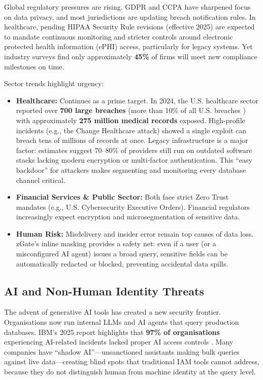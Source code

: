 Global regulatory pressures are rising. GDPR and CCPA have sharpened focus on data privacy, and most jurisdictions are updating breach notification rules. In healthcare, pending HIPAA Security Rule revisions (effective 2025) are expected to mandate continuous monitoring and stricter controls around electronic protected health information (ePHI) access, particularly for legacy systems. Yet industry surveys find only approximately \textbf{45\%} of firms will meet new compliance milestones on time.

Sector trends highlight urgency:

\begin{itemize}
  \item \textbf{Healthcare:} Continues as a prime target. In 2024, the U.S. healthcare sector reported over \textbf{700 large breaches} (more than 10\% of all U.S. breaches \cite{hipaajournal2024}) with approximately \textbf{275 million medical records} exposed. High-profile incidents (e.g., the Change Healthcare attack) showed a single exploit can breach tens of millions of records at once. Legacy infrastructure is a major factor: estimates suggest 70--80\% of providers still run on outdated software stacks lacking modern encryption or multi-factor authentication. This ``easy backdoor'' for attackers makes segmenting and monitoring every database channel critical.
  \item \textbf{Financial Services \& Public Sector:} Both face strict Zero Trust mandates (e.g., U.S. Cybersecurity Executive Orders). Financial regulators increasingly expect encryption and microsegmentation of sensitive data.
  \item \textbf{Human Risk:} Misdelivery and insider error remain top causes of data loss. zGate's inline masking provides a safety net: even if a user (or a misconfigured AI agent) issues a broad query, sensitive fields can be automatically redacted or blocked, preventing accidental data spills.
\end{itemize}

\subsection{AI and Non-Human Identity Threats}

The advent of generative AI tools has created a new security frontier. Organisations now run internal LLMs and AI agents that query production databases. IBM's 2025 report highlights that \textbf{97\% of organisations} experiencing AI-related incidents lacked proper AI access controls \cite{ibm2025}. Many companies have ``shadow AI''---unsanctioned assistants making bulk queries against live data---creating blind spots that traditional IAM tools cannot address, because they do not distinguish human from machine identity at the query level.

